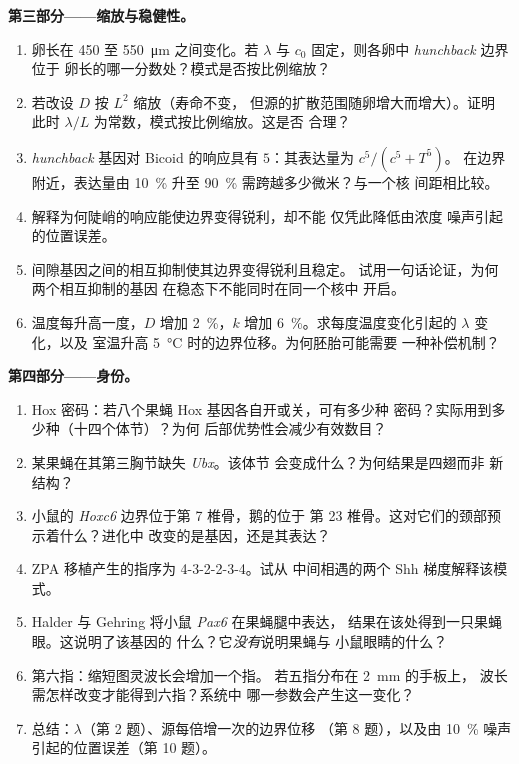 \begin{problem}
\medskip
\noindent\textbf{第三部分——缩放与稳健性。}
\begin{enumerate}[resume]
  \item 卵长在 \qty{450}{} 至 \qty{550}{\micro m} 之间变化。若 $\lambda$
        与 $c_{0}$ 固定，则各卵中 \emph{hunchback} 边界位于
        卵长的哪一分数处？模式是否按比例缩放？
  \item 若改设 $D$ 按 $L^{2}$ 缩放（寿命不变，
        但源的扩散范围随卵增大而增大）。证明
        此时 $\lambda/L$ 为常数，模式按比例缩放。这是否
        合理？
  \item \emph{hunchback} 基因对 Bicoid 的响应具有
        $5$：其表达量为 $c^{5}/(c^{5} + T^{5})$。
        在边界附近，表达量由 \qty{10}{\%} 升至
        \qty{90}{\%} 需跨越多少微米？与一个核
        间距相比较。
  \item 解释为何陡峭的响应能使边界变得锐利，却不能
        仅凭此降低由浓度
        噪声引起的位置误差。
  \item 间隙基因之间的相互抑制使其边界变得锐利且稳定。
        试用一句话论证，为何两个相互抑制的基因
        在稳态下不能同时在同一个核中
        开启。
  \item 温度每升高一度，$D$ 增加 \qty{2}{\%}，$k$ 增加
        \qty{6}{\%}。求每度温度变化引起的 $\lambda$ 变化，以及
        室温升高 \qty{5}{\celsius} 时的边界位移。为何胚胎可能需要
        一种补偿机制？
\end{enumerate}

\medskip
\noindent\textbf{第四部分——身份。}
\begin{enumerate}[resume]
  \item Hox 密码：若八个果蝇 Hox 基因各自开或关，可有多少种
        密码？实际用到多少种（十四个体节）？为何
        后部优势性会减少有效数目？
  \item 某果蝇在其第三胸节缺失 \emph{Ubx}。该体节
        会变成什么？为何结果是四翅而非
        新结构？
  \item 小鼠的 \emph{Hoxc6} 边界位于第 7 椎骨，鹅的位于
        第 23 椎骨。这对它们的颈部预示着什么？进化中
        改变的是基因，还是其表达？
  \item ZPA 移植产生的指序为 4-3-2-2-3-4。试从
        中间相遇的两个 Shh 梯度解释该模式。
  \item Halder 与 Gehring 将小鼠 \emph{Pax6} 在果蝇腿中表达，
        结果在该处得到一只果蝇眼。这说明了该基因的
        什么？它\emph{没有}说明果蝇与
        小鼠眼睛的什么？
  \item 第六指：缩短图灵波长会增加一个指。
        若五指分布在 \qty{2}{mm} 的手板上，
        波长需怎样改变才能得到六指？系统中
        哪一参数会产生这一变化？
  \item 总结：$\lambda$（第 2 题）、源每倍增一次的边界位移
        （第 8 题），以及由
        \qty{10}{\%} 噪声引起的位置误差（第 10 题）。
\end{enumerate}
\end{problem}
